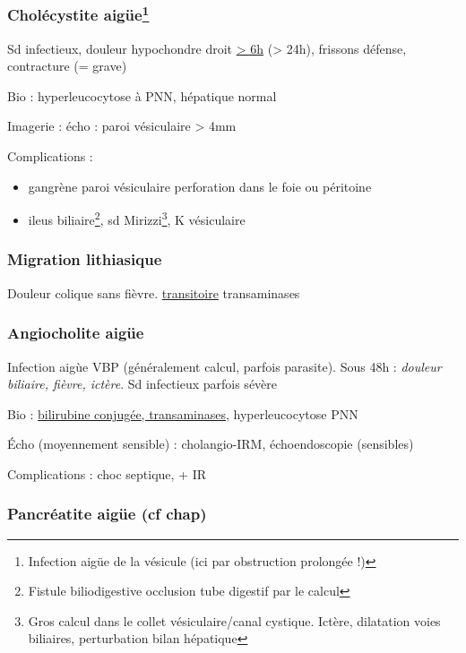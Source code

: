 \documentclass[11pt]{article}
\begin{document}
\subsubsection{Cholécystite aigüe\footnote{Infection aigüe de la vésicule (ici par obstruction prolongée !)}}
\label{sec:orga04f1b6}
Sd infectieux, douleur hypochondre droit \uline{> 6h} (> 24h), frissons \textpm{} défense,
contracture (= grave)

Bio : hyperleucocytose à PNN, hépatique normal

Imagerie : écho : paroi vésiculaire > 4mm

Complications : 
\begin{itemize}
\item gangrène paroi vésiculaire \thus perforation dans le foie ou
péritoine
\item ileus biliaire\footnote{Fistule biliodigestive \thus occlusion tube digestif par le calcul}, sd Mirizzi\footnote{Gros calcul dans le collet vésiculaire/canal cystique. Ictère,
dilatation voies biliaires, perturbation bilan hépatique}, K vésiculaire
\end{itemize}


\subsubsection{Migration lithiasique}
\label{sec:orgabde85b}
Douleur colique sans fièvre. \inc \uline{transitoire} transaminases

\subsubsection{Angiocholite aigüe}
\label{sec:org9f562eb}
Infection aigùe \gls{VBP} (généralement calcul, parfois parasite). Sous 48h :
\emph{douleur biliaire, fièvre, ictère}.
Sd infectieux parfois sévère

Bio : \uline{\inc bilirubine conjugée, \inc transaminases}, hyperleucocytose PNN

Écho (moyennement sensible) : cholangio-IRM, échoendoscopie (sensibles) 

Complications : choc septique, + IR

\subsubsection{Pancréatite aigüe (cf chap)}
\label{sec:org5a66e78}
\end{document}
